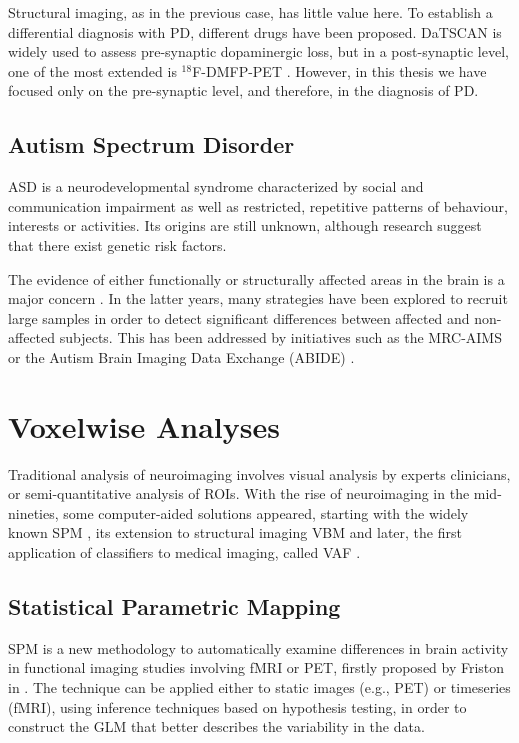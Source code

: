 Structural imaging, as in the previous case, has little value here. To establish a differential diagnosis with \ac{PD}, different drugs have been proposed. DaTSCAN is widely used to assess pre-synaptic dopaminergic loss, but in a post-synaptic level, one of the most extended is $^{18}$F-DMFP-PET \cite{Segovia2016a}. However, in this thesis we have focused only on the pre-synaptic level, and therefore, in the diagnosis of \ac{PD}. 

\subsection{Autism Spectrum Disorder}
\acf{ASD} is a neurodevelopmental syndrome characterized by social and communication impairment as well as restricted, repetitive patterns of behaviour, interests or activities. Its origins are still unknown, although research suggest \cite{Szatmari1999} that there exist genetic risk factors. 

The evidence of either functionally or structurally affected areas in the brain is a major concern \cite{Ecker2014,haar2014anatomical}. In the latter years, many strategies have been explored to recruit large samples in order to detect significant differences between affected and non-affected subjects. This has been addressed by initiatives such as the \ac{MRC-AIMS} \cite{Ecker2012,Ecker2013} or the Autism Brain Imaging Data Exchange (ABIDE) \cite{DiMartino2014}. 


\section{Voxelwise Analyses}\label{sec:vwanalyses}
Traditional analysis of neuroimaging involves visual analysis by experts clinicians, or semi-quantitative analysis of \acp{ROI}. With the rise of neuroimaging in the mid-nineties, some computer-aided solutions appeared, starting with the widely known \acf{SPM} \cite{Friston1994}, its extension to structural imaging \acf{VBM} \cite{Ashburner2000} and later, the first application of classifiers to medical imaging, called \acf{VAF} \cite{Stoeckel04}.

\subsection{Statistical Parametric Mapping}
\acf{SPM} is a new methodology to automatically examine differences in brain activity in functional imaging studies involving \ac{fMRI} or \ac{PET}, firstly proposed by Friston in \cite{Friston1994}. The technique can be applied either to static images (e.g., \ac{PET}) or timeseries (\ac{fMRI}), using inference techniques based on hypothesis testing, in order to construct the \ac{GLM} that better describes the variability in the data. 

